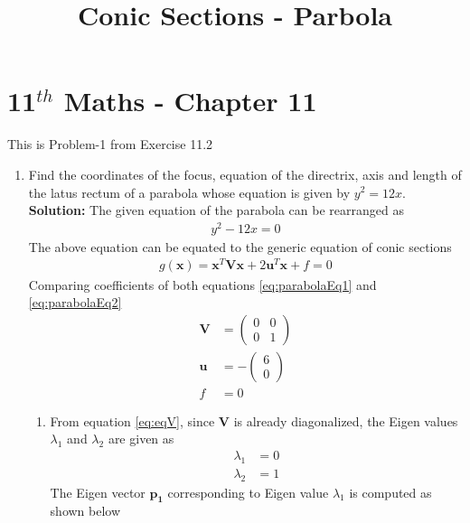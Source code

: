 \documentclass[12pt]{article}
\providecommand{\brak}[1]{\ensuremath{\left(#1\right)}}
\newcommand{\solution}{\noindent \textbf{Solution: }}
\newcommand{\myvec}[1]{\ensuremath{\begin{pmatrix}#1\end{pmatrix}}}
\let\vec\mathbf
\begin{document}
\begin{center}
\title{\textbf{Conic Sections - Parbola}}
\date{\vspace{-5ex}} %
\maketitle
\end{center}
\setcounter{page}{1}

\section{11$^{th}$ Maths - Chapter 11}
This is Problem-1 from Exercise 11.2
\begin{enumerate}
\item Find the coordinates of the focus, equation of the directrix, axis and length of the latus rectum of a parabola whose equation is given by $y^2 = 12x$. \\ 
\solution 
The given equation of the parabola can be rearranged as
\begin{align}
    \label{eq:parabolaEq1}
    y^2-12x = 0
\end{align}
The above equation can be equated to the generic equation of conic sections
\begin{align}
	\label{eq:parabolaEq2}
	g\brak{\vec{x}} = \vec{x}^T\vec{V}\vec{x} + 2\vec{u}^T\vec{x} + f = 0 
\end{align}
Comparing coefficients of both equations \eqref{eq:parabolaEq1} and \eqref{eq:parabolaEq2} 
\begin{align}
	\label{eq:eqV}
	\vec{V} &= \myvec{ 0 & 0 \\ 0 & 1} \\
	\label{eq:eqU}
	\vec{u} &= -\myvec{6 \\ 0} \\
	\label{eq:eqF}
	f &= 0 
\end{align}
\begin{enumerate}
\item  
From equation \eqref{eq:eqV}, since $\vec{V}$ is already diagonalized, the Eigen values $\lambda_1$ and $\lambda_2$ are given as 
\begin{align}
	\label{eq:eqEigen1}
	\lambda_1 &= 0 \\
	\label{eq:eqEigen2}
	\lambda_2 &= 1 
\end{align}
The Eigen vector $\vec{p_1}$ corresponding to Eigen value $\lambda_1$ is computed as shown below
\begin{align}

\end{align}
\end{enumerate}
\end{enumerate}
\end{document}
